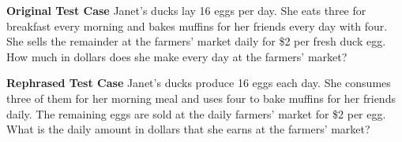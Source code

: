 

\begin{example}\label{def:rephrase-gsm8k}
\textbf{Original Test Case} \newline 
Janet’s ducks lay 16 eggs per day. She eats three for breakfast every morning and bakes muffins for her friends every day with four. She sells the remainder at the farmers' market daily for \$2 per fresh duck egg. How much in dollars does she make every day at the farmers' market?


\vspace{0.5cm} %

\textbf{Rephrased Test Case} \newline
Janet's ducks produce 16 eggs each day. She consumes three of them for her morning meal and uses four to bake muffins for her friends daily. The remaining eggs are sold at the daily farmers' market for \$2 per egg. What is the daily amount in dollars that she earns at the farmers' market? 
\end{example}

